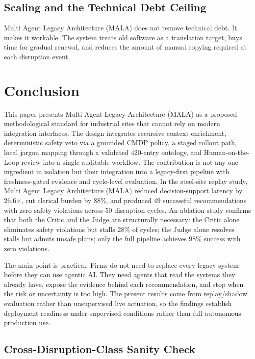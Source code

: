 \documentclass[conference]{IEEEtran}
\newcommand{\MALA}{Multi Agent Legacy Architecture (MALA)}
\begin{document}
\subsection{Scaling and the Technical Debt Ceiling}

\MALA{} does not remove technical debt. It makes it workable. The system treats old software as a translation target, buys time for gradual renewal, and reduces the amount of manual copying required at each disruption event.


\section{Conclusion}

This paper presents \MALA{} as a proposed methodological standard for industrial sites that cannot rely on modern integration interfaces. The design integrates recursive context enrichment, deterministic safety veto via a grounded CMDP policy, a staged rollout path, local jargon mapping through a validated 420-entry ontology, and Human-on-the-Loop review into a single auditable workflow. The contribution is not any one ingredient in isolation but their integration into a legacy-first pipeline with freshness-gated evidence and cycle-level evaluation. In the steel-site replay study, \MALA{} reduced decision-support latency by 26.6$\times$, cut clerical burden by 88\%, and produced 49 successful recommendations with zero safety violations across 50 disruption cycles. An ablation study confirms that both the Critic and the Judge are structurally necessary: the Critic alone eliminates safety violations but stalls 28\% of cycles; the Judge alone resolves stalls but admits unsafe plans; only the full pipeline achieves 98\% success with zero violations.

The main point is practical. Firms do not need to replace every legacy system before they can use agentic AI. They need agents that read the systems they already have, expose the evidence behind each recommendation, and stop when the risk or uncertainty is too high. The present results come from replay/shadow evaluation rather than unsupervised live actuation, so the findings establish deployment readiness under supervised conditions rather than full autonomous production use.

\subsection*{Cross-Disruption-Class Sanity Check}
\end{document}
